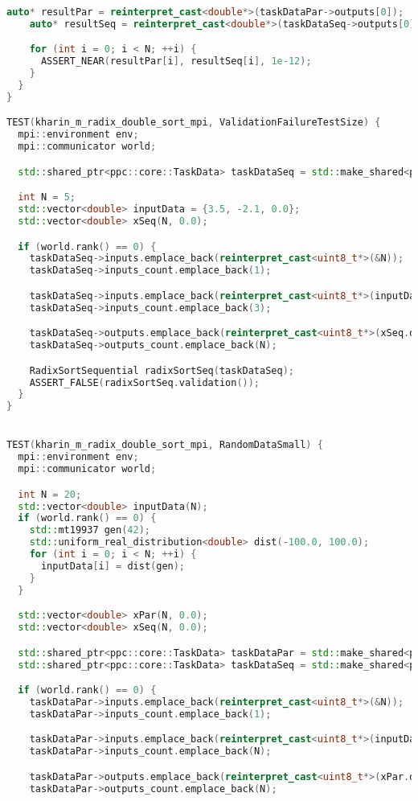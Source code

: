 \documentclass[a4paper,12pt]{article}
\begin{document}
\begin{lstlisting}[language=C++, caption={Тесты}]
    auto* resultPar = reinterpret_cast<double*>(taskDataPar->outputs[0]);
    auto* resultSeq = reinterpret_cast<double*>(taskDataSeq->outputs[0]);

    for (int i = 0; i < N; ++i) {
      ASSERT_NEAR(resultPar[i], resultSeq[i], 1e-12);
    }
  }
}

TEST(kharin_m_radix_double_sort_mpi, ValidationFailureTestSize) {
  mpi::environment env;
  mpi::communicator world;

  std::shared_ptr<ppc::core::TaskData> taskDataSeq = std::make_shared<ppc::core::TaskData>();

  int N = 5;
  std::vector<double> inputData = {3.5, -2.1, 0.0}; 
  std::vector<double> xSeq(N, 0.0);

  if (world.rank() == 0) {
    taskDataSeq->inputs.emplace_back(reinterpret_cast<uint8_t*>(&N));
    taskDataSeq->inputs_count.emplace_back(1);

    taskDataSeq->inputs.emplace_back(reinterpret_cast<uint8_t*>(inputData.data()));
    taskDataSeq->inputs_count.emplace_back(3);

    taskDataSeq->outputs.emplace_back(reinterpret_cast<uint8_t*>(xSeq.data()));
    taskDataSeq->outputs_count.emplace_back(N);

    RadixSortSequential radixSortSeq(taskDataSeq);
    ASSERT_FALSE(radixSortSeq.validation());
  }
}


TEST(kharin_m_radix_double_sort_mpi, RandomDataSmall) {
  mpi::environment env;
  mpi::communicator world;

  int N = 20;
  std::vector<double> inputData(N);
  if (world.rank() == 0) {
    std::mt19937 gen(42);
    std::uniform_real_distribution<double> dist(-100.0, 100.0);
    for (int i = 0; i < N; ++i) {
      inputData[i] = dist(gen);
    }
  }

  std::vector<double> xPar(N, 0.0);
  std::vector<double> xSeq(N, 0.0);

  std::shared_ptr<ppc::core::TaskData> taskDataPar = std::make_shared<ppc::core::TaskData>();
  std::shared_ptr<ppc::core::TaskData> taskDataSeq = std::make_shared<ppc::core::TaskData>();

  if (world.rank() == 0) {
    taskDataPar->inputs.emplace_back(reinterpret_cast<uint8_t*>(&N));
    taskDataPar->inputs_count.emplace_back(1);

    taskDataPar->inputs.emplace_back(reinterpret_cast<uint8_t*>(inputData.data()));
    taskDataPar->inputs_count.emplace_back(N);

    taskDataPar->outputs.emplace_back(reinterpret_cast<uint8_t*>(xPar.data()));
    taskDataPar->outputs_count.emplace_back(N);


\end{lstlisting}
\end{document}

